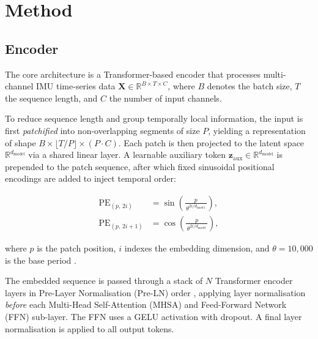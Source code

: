 \section{Method}\label{sec:Method}


\subsection{Encoder}

The core architecture is a Transformer-based encoder that processes multi-channel IMU
time-series data $\mathbf{X} \in \mathbb{R}^{B \times T \times C}$, where $B$ denotes
the batch size, $T$ the sequence length, and $C$ the number of input channels.

To reduce sequence length and group temporally local information, the input is first
\emph{patchified} into non-overlapping segments of size $P$, yielding a representation
of shape $B \times \lfloor T / P \rfloor \times (P \cdot C)$.  Each patch is then
projected to the latent space $\mathbb{R}^{d_{\text{model}}}$ via a shared linear layer.
A learnable auxiliary token $\mathbf{z}_{\text{aux}} \in \mathbb{R}^{d_{\text{model}}}$
is prepended to the patch sequence, after which fixed sinusoidal positional encodings are
added to inject temporal order:

\begin{align}
    \text{PE}_{(p,\,2i)}   &= \sin\!\left(\frac{p}{\,\theta^{2i/d_{\text{model}}}\,}\right), \\
    \text{PE}_{(p,\,2i+1)} &= \cos\!\left(\frac{p}{\,\theta^{2i/d_{\text{model}}}\,}\right),
\end{align}

\noindent where $p$ is the patch position, $i$ indexes the embedding dimension, and
$\theta = 10{,}000$ is the base period \cite{vaswani2017attention}.

The embedded sequence is passed through a stack of $N$ Transformer encoder layers in
Pre-Layer Normalisation (Pre-LN) order \cite{PLACEHOLDER}, applying layer normalisation
\emph{before} each Multi-Head Self-Attention (MHSA) and Feed-Forward Network (FFN)
sub-layer.  The FFN uses a GELU activation with dropout.  A final layer normalisation
is applied to all output tokens.

